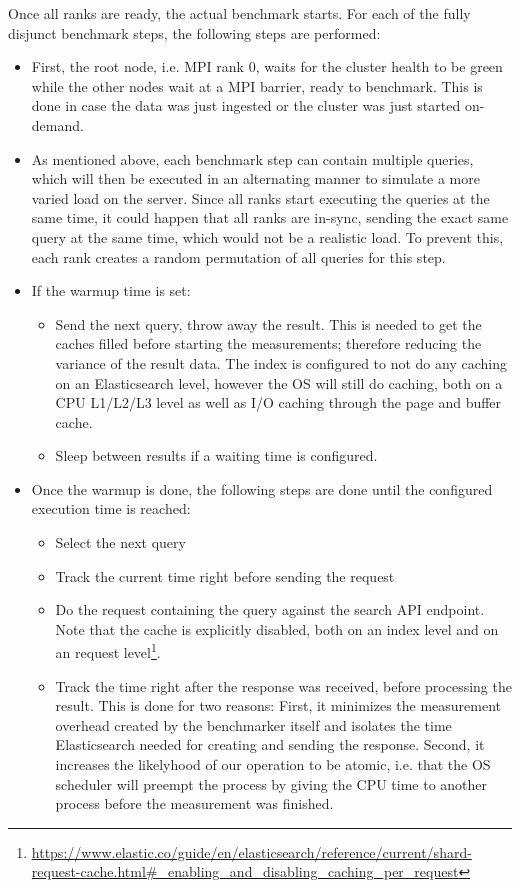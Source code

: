 Once all ranks are ready, the actual benchmark starts. For each of the fully disjunct benchmark steps, the following steps are performed:
\begin{itemize}
  \item First, the root node, i.e. \ac{MPI} rank 0, waits for the cluster health to be green while the other nodes wait at a \ac{MPI} barrier, ready to benchmark. This is done in case the data was just ingested or the cluster was just started on-demand.
  \item As mentioned above, each benchmark step can contain multiple queries, which will then be executed in an alternating manner to simulate a more varied load on the server. Since all ranks start executing the queries at the same time, it could happen that all ranks are in-sync, sending the exact same query at the same time, which would not be a realistic load. To prevent this, each rank creates a random permutation of all queries for this step.
  \item If the warmup time is set:
    \begin{itemize}
      \item Send the next query, throw away the result. This is needed to get the caches filled before starting the measurements; therefore reducing the variance of the result data. The index is configured to not do any caching on an Elasticsearch level, however the OS will still do caching, both on a CPU L1/L2/L3 level as well as I/O caching through the page and buffer cache.
      \item Sleep between results if a waiting time is configured.
    \end{itemize}
  \item Once the warmup is done, the following steps are done until the configured execution time is reached:
    \begin{itemize}
      \item Select the next query
      \item Track the current time right before sending the request
      \item Do the request containing the query against the search API endpoint. Note that the cache is explicitly disabled, both on an index level and on an request level\footnote{\url{https://www.elastic.co/guide/en/elasticsearch/reference/current/shard-request-cache.html\#_enabling_and_disabling_caching_per_request}}.
      \item Track the time right after the response was received, before processing the result. This is done for two reasons: First, it minimizes the measurement overhead created by the benchmarker itself and isolates the time Elasticsearch needed for creating and sending the response. Second, it increases the likelyhood of our operation to be atomic, i.e. that the OS scheduler will preempt the process by giving the CPU time to another process before the measurement was finished.

\end{itemize}
\end{itemize}
